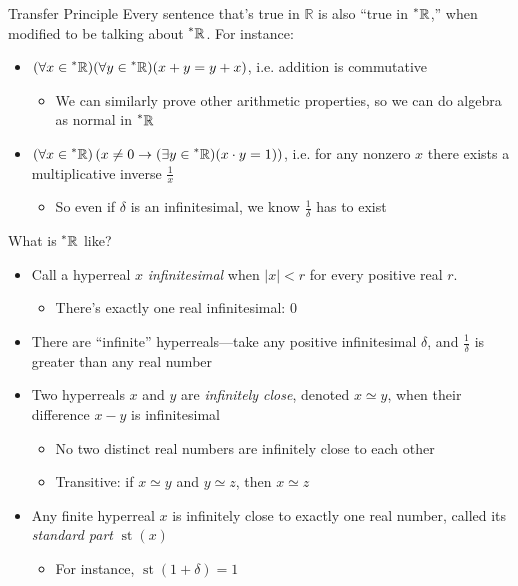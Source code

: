 \documentclass{beamer}
\theoremstyle{plain}
\theoremstyle{definition}
\newcommand{\stp}[1]{\st\left(#1\right)}
\newcommand{\reals}{\mathbb{R}}
\newcommand{\hreals}{\prescript{*}{}{\mathbb{R}}}
\DeclareMathOperator{\st}{st}
\begin{document}
\begin{frame}{Transfer Principle}
Every sentence that's true in $\reals$ is also ``true in $\hreals$,'' when modified to be talking about $\hreals$. For instance: \vspace{6pt}
\begin{itemize} \itemsep = 8pt
	\item $(\forall x \in \hreals)(\forall y \in \hreals)(x + y = y + x)$, i.e. addition is commutative
	\begin{itemize}
		\item We can similarly prove other arithmetic properties, so we can do algebra as normal in $\hreals$
	\end{itemize}
	\item $(\forall x \in \hreals)\left(x \neq 0 \to (\exists y \in \hreals)(x \cdot y = 1)\right)$, i.e. for any nonzero $x$ there exists a multiplicative inverse $\frac{1}{x}$
	\begin{itemize}
		\item So even if $\delta$ is an infinitesimal, we know $\frac{1}{\delta}$ has to exist
	\end{itemize}
\end{itemize}
\end{frame}

\begin{frame}{What is $\hreals$ like?} 
\begin{itemize} \itemsep = 8pt
\item Call a hyperreal $x$ \textit{infinitesimal} when $|x| < r$ for every positive real $r$. 
	\begin{itemize}
	\item There's exactly one real infinitesimal: $0$
	\end{itemize}
\item There are ``infinite'' hyperreals---take any positive infinitesimal $\delta$, and $\frac{1}{\delta}$ is greater than any real number
\item Two hyperreals $x$ and $y$ are \textit{infinitely close}, denoted $x \simeq y$, when their difference $x - y$ is infinitesimal
	\begin{itemize}
	\item No two distinct real numbers are infinitely close to each other
	\item Transitive: if $x \simeq y$ and $y \simeq z$, then $x \simeq z$
	\end{itemize}
\item Any finite hyperreal $x$ is infinitely close to exactly one real number, called its \textit{standard part} $\stp{x}$
	\begin{itemize}
	\item For instance, $\stp{1 + \delta} = 1$
	\end{itemize}
\end{itemize}
\end{frame}
\end{document}
